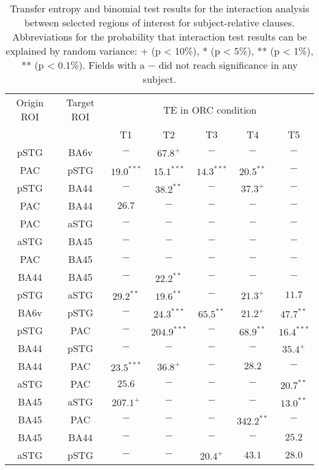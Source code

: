 \vspace{5mm}
\begin{table}[h]
\begin{center}
\begin{tabular}{ccccccc}
Origin ROI & Target ROI & \multicolumn{5}{c}{TE in ORC condition} \\
           &            &      T1 & T2 & T3 & T4 & T5             \\ \hline

pSTG & BA6v & $-$ & $67.8^{+}$ & $-$ & $-$ & $-$ \\ 
PAC & pSTG & $19.0^{***}$ & $15.1^{***}$ & $14.3^{***}$ & $20.5^{**}$ & $-$ \\ 
pSTG & BA44 & $-$ & $38.2^{**}$ & $-$ & $37.3^{+}$ & $-$ \\ 
PAC & BA44 & $26.7$ & $-$ & $-$ & $-$ & $-$ \\ 
PAC & aSTG & $-$ & $-$ & $-$ & $-$ & $-$ \\ 
aSTG & BA45 & $-$ & $-$ & $-$ & $-$ & $-$ \\ 
PAC & BA45 & $-$ & $-$ & $-$ & $-$ & $-$ \\ 
BA44 & BA45 & $-$ & $22.2^{**}$ & $-$ & $-$ & $-$ \\ 
pSTG & aSTG & $29.2^{**}$ & $19.6^{**}$ & $-$ & $21.3^{+}$ & $11.7$ \\ 
BA6v & pSTG & $-$ & $24.3^{***}$ & $65.5^{**}$ & $21.2^{+}$ & $47.7^{**}$ \\ 
pSTG & PAC & $-$ & $204.9^{***}$ & $-$ & $68.9^{**}$ & $16.4^{***}$ \\ 
BA44 & pSTG & $-$ & $-$ & $-$ & $-$ & $35.4^{+}$ \\ 
BA44 & PAC & $23.5^{***}$ & $36.8^{+}$ & $-$ & $28.2$ & $-$ \\ 
aSTG & PAC & $25.6$ & $-$ & $-$ & $-$ & $20.7^{**}$ \\ 
BA45 & aSTG & $207.1^{+}$ & $-$ & $-$ & $-$ & $13.0^{**}$ \\ 
BA45 & PAC & $-$ & $-$ & $-$ & $342.2^{**}$ & $-$ \\ 
BA45 & BA44 & $-$ & $-$ & $-$ & $-$ & $25.2$ \\ 
aSTG & pSTG & $-$ & $-$ & $20.4^{+}$ & $43.1$ & $28.0$ \\ 
\end{tabular}
\caption{\label{4.4.TEvalues.a} Transfer entropy and binomial test results for the interaction analysis between selected regions of interest for subject-relative clauses. Abbreviations for the probability that interaction test results can be explained by random variance: + (p < 10\%), * (p < 5\%), ** (p < 1\%), ** (p < 0.1\%). Fields with a $-$ did not reach significance in any subject.}
\end{center}
\end{table}
\vspace{5mm}

